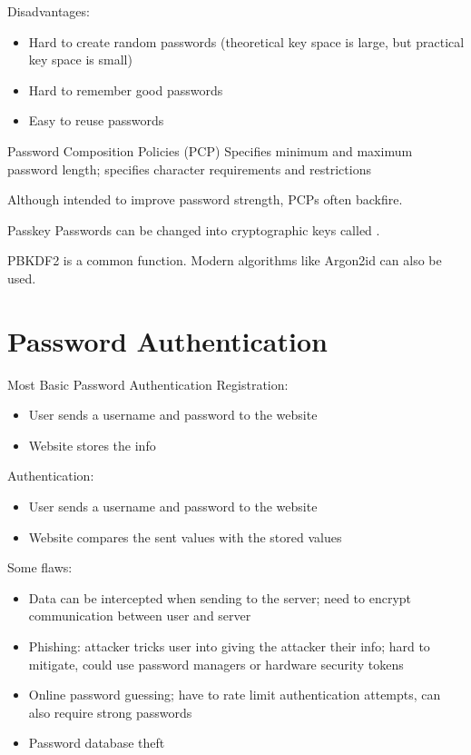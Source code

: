\documentclass[12pt]{report}
\begin{document}
Disadvantages:
\begin{itemize}
    \item Hard to create random passwords (theoretical key space is large, but practical key space is small)
    \item Hard to remember good passwords
    \item Easy to reuse passwords
\end{itemize}

\begin{dfnbox}{Password Composition Policies (PCP)}{}
    Specifies minimum and maximum password length; specifies character requirements and restrictions
\end{dfnbox}

Although intended to improve password strength, PCPs often backfire.

\begin{dfnbox}{Passkey}{}
    Passwords can be changed into cryptographic keys called .
\end{dfnbox}

PBKDF2 is a common function. Modern algorithms like Argon2id can also be used.

\section{Password Authentication}


\begin{exbox}{Most Basic Password Authentication}{}
    Registration:
    \begin{itemize}[noitemsep]
        \item User sends a username and password to the website
        \item Website stores the info
    \end{itemize}
    Authentication:
    \begin{itemize}[noitemsep]
        \item User sends a username and password to the website
        \item Website compares the sent values with the stored values
    \end{itemize}
    \tcblower
    Some flaws:
    \begin{itemize}
        \item Data can be intercepted when sending to the server; need to encrypt communication between user and server
        \item Phishing: attacker tricks user into giving the attacker their info; hard to mitigate, could use password managers or hardware security tokens
        \item Online password guessing; have to rate limit authentication attempts, can also require strong passwords
        \item Password database theft
    \end{itemize}
\end{exbox}
\end{document}
